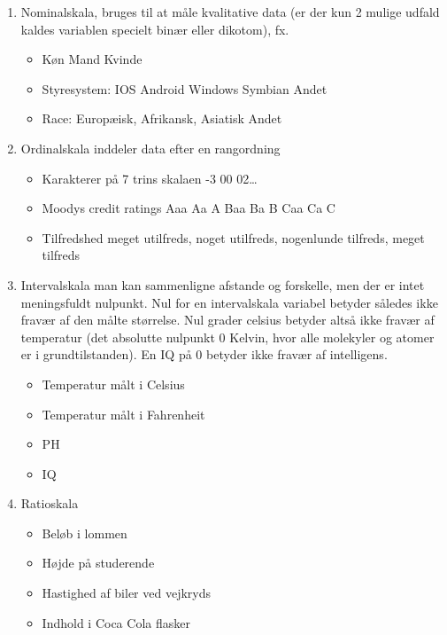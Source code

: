 \documentclass[]{book}
\providecommand{\tightlist}{%
  \setlength{\itemsep}{0pt}\setlength{\parskip}{0pt}}
\theoremstyle{definition}
\theoremstyle{definition}
\theoremstyle{definition}
\theoremstyle{remark}
\begin{document}
\begin{enumerate}
\def\labelenumi{\arabic{enumi}.}
\tightlist
\item
  Nominalskala, bruges til at måle kvalitative data (er der kun 2 mulige
  udfald kaldes variablen specielt binær eller dikotom), fx.

  \begin{itemize}
  \tightlist
  \item
    Køn Mand Kvinde\\
  \item
    Styresystem: IOS Android Windows Symbian Andet
  \item
    Race: Europæisk, Afrikansk, Asiatisk Andet
  \end{itemize}
\item
  Ordinalskala inddeler data efter en rangordning

  \begin{itemize}
  \tightlist
  \item
    Karakterer på 7 trins skalaen -3 00 02\ldots{}
  \item
    Moodys credit ratings Aaa Aa A Baa Ba B Caa Ca C
  \item
    Tilfredshed meget utilfreds, noget utilfreds, nogenlunde tilfreds,
    meget tilfreds
  \end{itemize}
\item
  Intervalskala man kan sammenligne afstande og forskelle, men der er
  intet meningsfuldt nulpunkt. Nul for en intervalskala variabel betyder
  således ikke fravær af den målte størrelse. Nul grader celsius betyder
  altså ikke fravær af temperatur (det absolutte nulpunkt 0 Kelvin, hvor
  alle molekyler og atomer er i grundtilstanden). En IQ på 0 betyder
  ikke fravær af intelligens.

  \begin{itemize}
  \tightlist
  \item
    Temperatur målt i Celsius 
  \item
    Temperatur målt i Fahrenheit
  \item
    PH
  \item
    IQ
  \end{itemize}
\item
  Ratioskala

  \begin{itemize}
  \tightlist
  \item
    Beløb i lommen
  \item
    Højde på studerende
  \item
    Hastighed af biler ved vejkryds
  \item
    Indhold i Coca Cola flasker 
  \end{itemize}
\end{enumerate}
\end{document}
